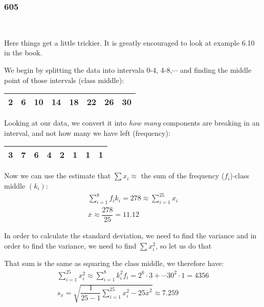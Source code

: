 \subsubsection{605}\hfill\\\par
\noindent Here things get a little trickier. It is greatly encouraged to look at example 6.10 in the book.
\par\bigskip
\noindent We begin by splitting the data into intervala 0-4, 4-8,$\cdots$ and finding the middle point of those intervals (class middle):
\par\bigskip
\begin{center}
  \begin{tabular}{|c|c|c|c|c|c|c|c|}
    \hline
    2&6&10&14&18&22&26&30\\
    \hline
  \end{tabular}
\end{center}
\par\bigskip
\noindent Looking at our data, we convert it into \textit{how many} components are breaking in an interval, and not how many we have left (frequency):
\par\bigskip
\begin{center}
  \begin{tabular}{|c|c|c|c|c|c|c|c|}
    \hline
    3&7&6&4&2&1&1&1\\
    \hline
  \end{tabular}
\end{center}
\par\bigskip
\noindent Now we can use the estimate that $\sum x_i\approx$ the sum of the frequency ($f_i$)$\cdot$class middle $(k_i)$:
\begin{equation*}
  \begin{gathered}
    \sum_{i=1}^{8}f_ik_i = 278\approx \sum_{i=1}^{25}x_i\\
    \overline{x}\approx \dfrac{278}{25} = 11.12
  \end{gathered}
\end{equation*}
\par\bigskip
\noindent In order to calculate the standard deviation, we need to find the variance and in order to find the variance, we need to find $\sum x_i^2$, so let us do that
\par\bigskip
\noindent That sum is the same as squaring the class middle, we therefore have:
\begin{equation*}
  \begin{gathered}
  \sum_{i=1}^{25}x_i^2\approx \sum_{i=1}^{8}k_i^2f_i = 2^6\cdot3+\cdots 30^2\cdot1 = 4356\\
  s_x = \sqrt{\dfrac{1}{25-1}\sum_{i=1}^{25}x_i^2-25\overline{x}^2} \approx 7.259
  \end{gathered}
\end{equation*}
